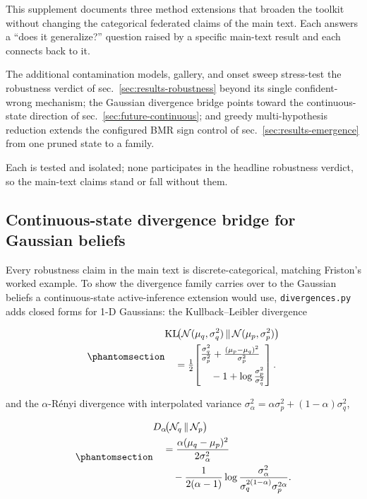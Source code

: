 \documentclass[
  english,
]{article}
\newcounter{none} %
\theoremstyle{plain}
\theoremstyle{definition}
\theoremstyle{remark}
\theoremstyle{definition}
\begin{document}
This supplement documents three method extensions that broaden the
toolkit without changing the categorical federated claims of the main
text. Each answers a ``does it generalize?'' question raised by a
specific main-text result and each connects back to it.

The additional contamination models, gallery, and onset sweep
stress-test the robustness verdict of sec.~\ref{sec:results-robustness}
beyond its single confident-wrong mechanism; the Gaussian divergence
bridge points toward the continuous-state direction of
sec.~\ref{sec:future-continuous}; and greedy multi-hypothesis reduction
extends the configured BMR sign control of
sec.~\ref{sec:results-emergence} from one pruned state to a family.

Each is tested and isolated; none participates in the headline
robustness verdict, so the main-text claims stand or fall without them.

\subsection{Continuous-state divergence bridge for Gaussian
beliefs}\label{sec:supp-gaussian}

Every robustness claim in the main text is discrete-categorical,
matching Friston's worked example. To show the divergence family carries
over to the Gaussian beliefs a continuous-state active-inference
extension would use, \texttt{divergences.py} adds closed forms for 1-D
Gaussians: the Kullback--Leibler divergence

\begin{equation}\protect\phantomsection\label{eq:gaussian-kl}{\begin{aligned}
&\mathrm{KL}\!\big(
  \mathcal N(\mu_q,\sigma_q^2)\,\|\,\mathcal N(\mu_p,\sigma_p^2)\big)\\
&\quad = \tfrac12\!\left[
\begin{aligned}
&\tfrac{\sigma_q^2}{\sigma_p^2}
 + \tfrac{(\mu_p-\mu_q)^2}{\sigma_p^2}\\
&\quad - 1 + \log\tfrac{\sigma_p^2}{\sigma_q^2}
\end{aligned}
\right].
\end{aligned}}\end{equation}

and the \(\alpha\)-Rényi divergence with interpolated variance
\(\sigma_\alpha^2 = \alpha\sigma_p^2 + (1-\alpha)\sigma_q^2\),

\begin{equation}\protect\phantomsection\label{eq:gaussian-renyi}{\begin{aligned}
&D_\alpha\!\big(\mathcal N_q\,\|\,\mathcal N_p\big)\\
&\quad = \frac{\alpha(\mu_q-\mu_p)^2}{2\sigma_\alpha^2}\\
&\qquad - \frac{1}{2(\alpha-1)}
\log\frac{\sigma_\alpha^2}
{\sigma_q^{2(1-\alpha)}\sigma_p^{2\alpha}}.
\end{aligned}}\end{equation}
\end{document}
